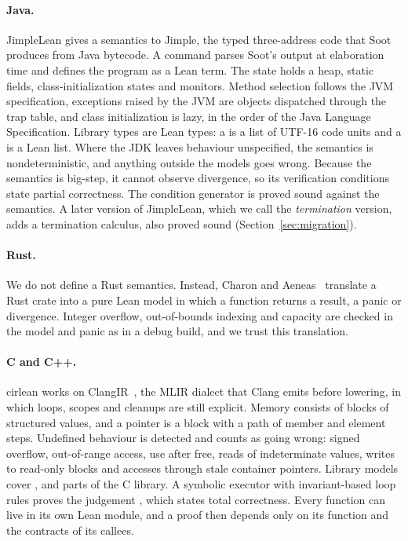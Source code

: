\paragraph{Java.} JimpleLean gives a semantics to Jimple, the typed three-address code that Soot~\cite{soot} produces
from Java bytecode. A command parses Soot's output at elaboration time and defines the program as a Lean term. The
state holds a heap, static fields, class-initialization states and monitors. Method selection follows the JVM
specification, exceptions raised by the JVM are objects dispatched through the trap table, and class initialization is
lazy, in the order of the Java Language Specification. Library types are Lean types: a  is a list of
UTF-16 code units and a  is a Lean list. Where the JDK leaves behaviour unspecified, the semantics is
nondeterministic, and anything outside the models goes wrong. Because the semantics is big-step, it cannot
observe divergence, so its verification conditions state partial correctness. The condition generator is proved
sound against the semantics. A later version of JimpleLean, which we call the \emph{termination} version, adds a termination calculus, also proved sound (Section~\ref{sec:migration}).

\paragraph{Rust.} We do not define a Rust semantics. Instead, Charon and Aeneas~\cite{aeneas} translate a Rust crate into a pure
Lean model in which a function returns a result, a panic or divergence. Integer overflow, out-of-bounds indexing and
 capacity are checked in the model and panic as in a debug build, and we trust this translation.

\paragraph{C and C++.} cirlean works on ClangIR~\cite{clangir}, the MLIR dialect that Clang emits before lowering, in
which loops, scopes and cleanups are still explicit. Memory consists of blocks of structured values, and a pointer is a
block with a path of member and element steps. Undefined behaviour is detected and counts as going wrong: signed overflow, out-of-range access,
use after free, reads of indeterminate values, writes to read-only blocks and accesses through stale container
pointers. Library models cover ,  and parts of the C library. A symbolic executor
with invariant-based loop rules proves the judgement , which states total correctness. Every function can
live in its own Lean module, and a proof then depends only on its function and the contracts of its callees.

